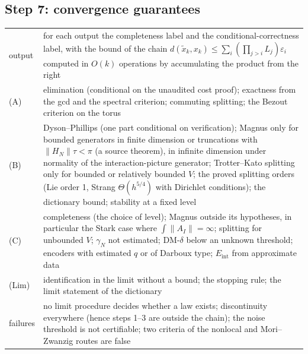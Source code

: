 \documentclass[11pt]{article}
\theoremstyle{plain}
\theoremstyle{definition}
\theoremstyle{remark}
\newcommand{\gN}{\gamma_{N}}                %
\begin{document}
\subsection*{Step 7: convergence guarantees}
\begin{tabular}{@{}p{2.2cm}p{9.6cm}@{}}
\toprule
output & for each output the completeness label and the conditional-correctness label, with the bound of the chain $d(\tilde x_k,x_k)\le\sum_i(\prod_{j>i}L_j)\varepsilon_i$ computed in $O(k)$ operations by accumulating the product from the right\\
(A) & elimination (conditional on the unaudited cost proof); exactness from the gcd and the spectral criterion; commuting splitting; the Bezout criterion on the torus\\
(B) & Dyson--Phillips (one part conditional on verification); Magnus only for bounded generators in finite dimension or truncations with $\lVert H_N\rVert\tau<\pi$ (a source theorem), in infinite dimension under normality of the interaction-picture generator; Trotter--Kato splitting only for bounded or relatively bounded $V$; the proved splitting orders (Lie order 1, Strang $\Theta(h^{5/4})$ with Dirichlet conditions); the dictionary bound; stability at a fixed level\\
(C) & completeness (the choice of level); Magnus outside its hypotheses, in particular the Stark case where $\int\lVert A_I\rVert=\infty$; splitting for unbounded $V$; $\gN$ not estimated; DM-$\delta$ below an unknown threshold; encoders with estimated $q$ or of Darboux type; $E_{\mathrm{int}}$ from approximate data\\
(Lim) & identification in the limit without a bound; the stopping rule; the limit statement of the dictionary\\
failures & no limit procedure decides whether a law exists; discontinuity everywhere (hence steps 1--3 are outside the chain); the noise threshold is not certifiable; two criteria of the nonlocal and Mori--Zwanzig routes are false\\
\bottomrule
\end{tabular}
\end{document}
